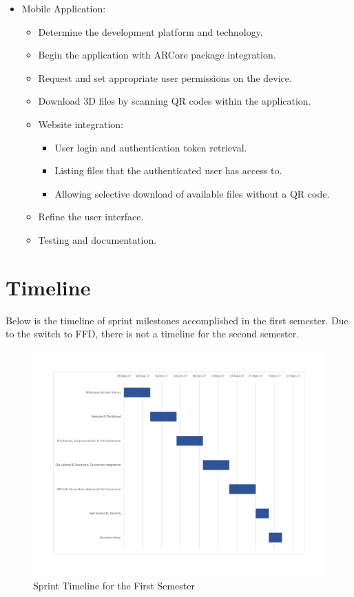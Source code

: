 \begin{itemize}
		\item Mobile Application:
		\begin{itemize}
			\item Determine the development platform and technology.
			\item Begin the application with ARCore package integration.
			\item Request and set appropriate user permissions on the device.
			\item Download 3D files by scanning QR codes within the application.
			\item Website integration:
			\begin{itemize}
				\item User login and authentication token retrieval.
				\item Listing files that the authenticated user has access to.
				\item Allowing selective download of available files without a QR code.
			\end{itemize}
			\item Refine the user interface.
			\item Testing and documentation.
		\end{itemize}
	\end{itemize}

\section{Timeline}
Below is the timeline of sprint milestones accomplished in the first semester. Due to the switch to FFD, there is not a timeline for the second semester.

\begin{figure}[H]
\begin{center}
\includegraphics[width=1\textwidth]{./SprintGanattChart}
\end{center}
\caption{Sprint Timeline for the First Semester}
\end{figure}
